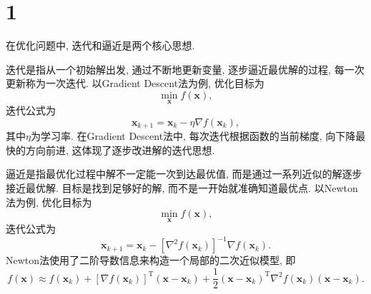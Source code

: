 \section*{1}

在优化问题中, 迭代和逼近是两个核心思想.

迭代是指从一个初始解出发, 通过不断地更新变量, 逐步逼近最优解的过程, 每一次更新称为一次迭代.
以Gradient Descent法为例, 优化目标为
\begin{equation*}
    \min_{\bm{x}} f(\bm{x}),
\end{equation*}
迭代公式为
\begin{equation*}
    \bm{x}_{k+1}=\bm{x}_k-\eta\nabla f(\bm{x}_k),
\end{equation*}
其中$\eta$为学习率.
在Gradient Descent法中, 每次迭代根据函数的当前梯度, 向下降最快的方向前进, 这体现了逐步改进解的迭代思想.

逼近是指最优化过程中解不一定能一次到达最优值, 而是通过一系列近似的解逐步接近最优解.
目标是找到足够好的解, 而不是一开始就准确知道最优点.
以Newton法为例, 优化目标为
\begin{equation*}
    \min_{\bm{x}} f(\bm{x}),
\end{equation*}
迭代公式为
\begin{equation*}
    \bm{x}_{k+1}=\bm{x}_k-\left[\nabla^2f(\bm{x}_k)\right]^{-1}\nabla f(\bm{x}_k).
\end{equation*}
Newton法使用了二阶导数信息来构造一个局部的二次近似模型, 即
\begin{equation*}
    f(\bm{x})\approx f(\bm{x}_k)+[\nabla f(\bm{x}_k)]^\mathrm{T}(\bm{x}-\bm{x}_k)+\frac{1}{2}(\bm{x}-\bm{x}_k)^\mathrm{T}\nabla^2 f(\bm{x}_k)(\bm{x}-\bm{x}_k).
\end{equation*}
